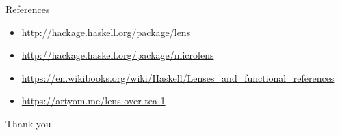 \documentclass[presentation,aspectratio=169,8pt]{beamer}
\begin{document}
\begin{frame}[label={sec:org066036c}]{References}
\begin{itemize}
\item \url{http://hackage.haskell.org/package/lens}
\item \url{http://hackage.haskell.org/package/microlens}
\item \url{https://en.wikibooks.org/wiki/Haskell/Lenses\_and\_functional\_references}
\item \url{https://artyom.me/lens-over-tea-1}
\end{itemize}
\end{frame}

\begin{frame}[label={sec:orgfbcde30}]{Thank you}
\end{frame}
\end{document}
